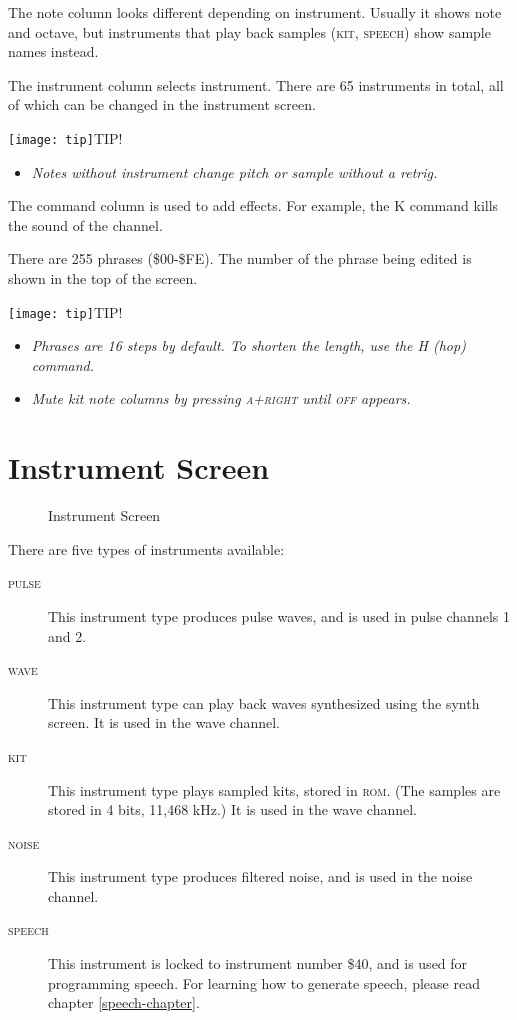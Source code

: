 The note column looks different depending on instrument. Usually it shows note and octave, but instruments that play back samples (\textsc{kit}, \textsc{speech}) show sample names instead.

The instrument column selects instrument. There are 65 instruments in total, all of which can be changed in the instrument screen.

\texttt{[image: tip]}TIP!
\begin{itemize}
    \item \textit{Notes without instrument change pitch or sample without a retrig.}
\end{itemize}

The command column is used to add effects. For example, the K command kills the sound of the channel.

There are 255 phrases (\$00-\$FE). The number of the phrase being edited is shown in the top of the screen.

\texttt{[image: tip]}TIP!
\begin{itemize}
    \item \textit{Phrases are 16 steps by default. To shorten the length, use the H (hop) command.}
    \item \textit{Mute kit note columns by pressing \textsc{a+right} until \textsc{off} appears.\footnotemark}
\end{itemize}


\section{Instrument Screen}

\begin{figure}[hbtp]
\centering
{}
\caption{Instrument Screen}
\label{fig:instr2}
\end{figure}

There are five types of instruments available:

\begin{description}
\item[\textsc{pulse}] This instrument type produces pulse waves, and is used in pulse channels 1 and 2.
\item[\textsc{wave}] This instrument type can play back waves synthesized using the synth screen. It is used in the wave channel.
\item[\textsc{kit}] This instrument type plays sampled kits, stored in \textsc{rom}. (The samples are stored in 4 bits, 11,468 kHz.) It is used in the wave channel.
\item[\textsc{noise}] This instrument type produces filtered noise, and is used in the noise channel.
\item[\textsc{speech}] This instrument is locked to instrument number \$40, and is used for programming speech. For learning how to generate speech, please read chapter \ref{speech-chapter}.
\end{description}

